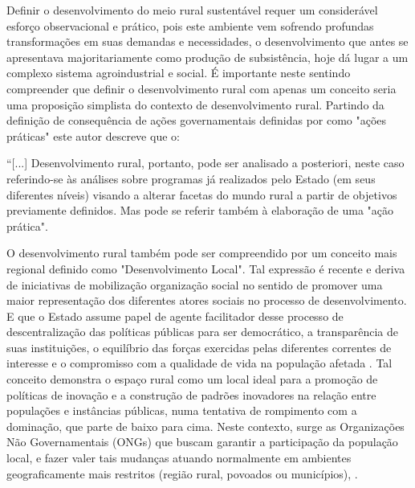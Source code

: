 Definir o desenvolvimento do meio rural sustentável requer um considerável esforço observacional e prático, pois este ambiente vem sofrendo profundas transformações em suas demandas e necessidades, o desenvolvimento que antes se apresentava majoritariamente como produção de subsistência, hoje dá lugar a um complexo sistema agroindustrial \cite{bastos_determinantes_2018} e social. É importante neste sentindo compreender que definir o desenvolvimento rural com apenas um conceito seria uma proposição simplista do contexto de desenvolvimento rural. Partindo da definição de consequência de ações governamentais definidas por  como "ações práticas" este autor descreve que o:

\begin{citacao}
“[...] Desenvolvimento rural, portanto, pode ser analisado a posteriori, neste caso referindo-se às análises sobre programas já realizados pelo Estado (em seus diferentes níveis) visando a alterar facetas do mundo rural a partir de objetivos previamente definidos. Mas pode se referir também à elaboração de uma "ação prática".
\end{citacao}

O desenvolvimento rural também pode ser compreendido por um conceito mais regional definido como "Desenvolvimento Local". Tal expressão é recente e deriva de iniciativas de mobilização organização social no sentido de promover uma maior representação dos diferentes atores sociais no processo de desenvolvimento. E que o Estado assume papel de agente facilitador desse processo de descentralização das políticas públicas  para ser democrático, a transparência de suas instituições, o equilíbrio das forças exercidas pelas diferentes correntes de interesse e o compromisso com a qualidade de vida na população afetada \cite{campanhola_diretrizes_2000}. Tal conceito demonstra o espaço rural como um local ideal para a promoção de políticas de inovação e a construção de padrões inovadores na relação entre populações e instâncias públicas, numa tentativa de rompimento com a dominação, que parte de baixo para cima. Neste contexto, surge as Organizações Não Governamentais (ONGs) que buscam garantir a participação da população local, e fazer valer tais mudanças atuando normalmente em ambientes geograficamente mais restritos (região rural, povoados ou municípios), \cite{assis_agricultura_2005, campanhola_diretrizes_2000}.

